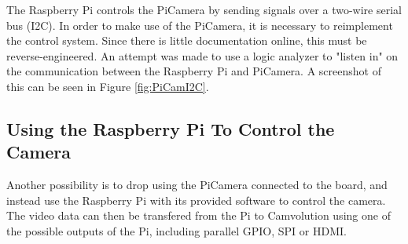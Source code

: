 The Raspberry Pi controls the PiCamera by sending signals over a two-wire serial bus (I2C).
In order to make use of the PiCamera, it is necessary to reimplement the control system.
Since there is little documentation online, this must be reverse-engineered.
An attempt was made to use a logic analyzer to "listen in" on the communication between the Raspberry Pi and PiCamera.
A screenshot of this can be seen in Figure \ref{fig:PiCamI2C}.

\subsection{Using the Raspberry Pi To Control the Camera}
Another possibility is to drop using the PiCamera connected to the board,
and instead use the Raspberry Pi with its provided software to control the camera.
The video data can then be transfered from the Pi to Camvolution using one of the possible outputs of the Pi, including parallel GPIO, SPI or HDMI.

